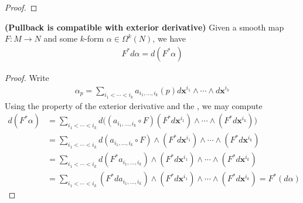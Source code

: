 \documentclass{report}
\begin{document}
\begin{proof}

\end{proof}
\begin{theorem}
\label{Pic}
\textbf{(Pullback is compatible with exterior derivative)} Given a smooth map $F:M\rightarrow N$ and some $k$-form  $\alpha \in \Omega^k(N)$, we have 
\begin{align*}
F^*d\alpha =d(F^* \alpha)  
\end{align*}
\end{theorem}
\begin{proof}
Write 
\begin{align*}
\alpha_p = \sum_{i_1 <\cdots <i_k} a_{i_1,\dots ,i_k}(p) d\textbf{x}^{i_1}\wedge  \cdots \wedge  d\textbf{x}^{i_k}  
\end{align*}
Using the property of the exterior derivative and the , we may compute 
\begin{align*}
d(F^* \alpha )&=\sum_{i_1<\cdots <i_k}  d \Big((a_{i_1,\dots ,i_k}\circ F) (F^*d\textbf{x}^{i_1})\wedge \cdots \wedge  (F^*d\textbf{x}^{i_k})   \Big) \\
&= \sum_{i_1 <\cdots <i_k} d(a_{i_1,\dots ,i_k}\circ F) \wedge  (F^* d\textbf{x}^{i_1}) \wedge  \cdots \wedge  (F^* d\textbf{x}^{i_k})  \\ 
&= \sum_{i_1 <\cdots <i_k} d(F^*a_{i_1,\dots ,i_k}) \wedge  (F^* d\textbf{x}^{i_1}) \wedge  \cdots \wedge  (F^* d\textbf{x}^{i_k})   \\
&=  \sum_{i_1 <\cdots <i_k} (F^*da_{i_1,\dots ,i_k}) \wedge  (F^* d\textbf{x}^{i_1}) \wedge  \cdots \wedge  (F^* d\textbf{x}^{i_k})  = F^*(d\alpha ) 
\end{align*}
\end{proof}
\end{document}
